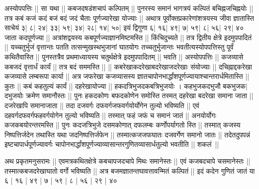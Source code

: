 \documentclass[12pt]{article}
\begin{document}
\pstart
{\s अस्योपपत्तिः || सा यथा ||
कबजदषडंशचापं कल्पितम् ||
पुनरस्य समानं भागत्रयं कल्पितं बचिह्नजचिह्नयोः ||
तत्र कबं कजं कदं बजं बदं जदं चैताः
पूर्णज्यारेखा योज्याः ||
अथात्र पूर्वोक्तप्रकारेणांशत्रयस्य जीवा ज्ञातास्ति साचेयं
३| ८| २४| ३३| ५९| ३४| २८| १४| ५०| इयं द्विगुणा
६| १६| ४९| ७| ५९| ८| ५६| २९| ४० जाता कदपूर्णज्या ||
अत्रांशद्वयस्य कबपूर्णज्याज्ञानमिष्टमस्ति ||
किंचिदुच्यते ||
तत्र
द्वितीय क्षेत्रे इदमुपपादितं ||
यच्चतुर्भुजं वृत्तान्तः पतति तत्सन्मुखस्थभुजानां घातयोगः
तच्चतुर्भुजान्तः
भवतीत्यस्योपपत्तिस्तु पूर्वं कथितैवास्ति ||
पुनस्तत्रैव प्रथ\-माध्यायस्य चतुर्थक्षेत्रे इदमुपपादितम् ||
%
{
} 
 भवति ||
अस्योपपत्तिः ||
कजव्यासे कबजदं वृत्तार्धं कार्यं ||
तत्र बदं 
सममस्ति || ||
कबरेखाकदरेखा\-बदरेखा\-जदरेखाः संयोज्याः ||
दचिह्नाद्दकरेखा कजव्यासे लम्बरूपा कार्या ||
अत्र जफरेखा कजव्यासस्य ज्ञातचापोनभार्द्धांशपूर्णज्यायाश्चान्तरार्धमितास्ति ||
कुतः ||
कबं कहतुल्यं कार्यं ||
दहरेखायोज्या ||
हकदत्रिभुज\-दकबत्रिभुजयोः ।
कहभुजकदभुजौ बकभुजक$|$%
दभुजयोः
क्रमेण समानौस्तः || पुनः हकदकोणः बफदकोणेन समोस्ति तस्मत् दहरेखा बदरेखा समाना जाता || दजरेखापि समानाजाता || तदा दजवर्गः दफवर्गजफवर्गयोर्योगेन तुल्यो भविष्यति ||
एवं दहवर्गदफवर्गफहवर्गयोगेन तुल्यो भविष्यति ||
तस्मात् फहं जफं च समानं जातं || अनयोर्योगः कजकबयोरन्तरमस्ति || पुनः कदजत्रिभुजे दसमकोणात् दफलम्बः कर्णोपर्यागतो स्ति ||
तस्मात् कजस्य निष्पत्तिर्जदेन तथास्ति
यथा जदनिष्पत्तिर्जफेन || तस्मात्कजजफघातः दजवर्गेण समानो जातः ||
तदेतदुपपन्नं इष्टचापार्धपूर्णज्यावर्गः चापोनभार्द्धांशपूर्णज्याव्यासान्तरगुणितव्यासार्धतुल्यो भवतीति ||
शकलं~||}
\pend

\vskip15pt

\pstart
{\s अथ प्रकृतमनुसरामः ||
एवमत्रकथितक्षेत्रे कबचापजदचापे मिथः समानेस्तः ||
एवं कजबदचापे चसमानेस्तः || तस्मात्कबजदरेखाघातो वर्गो भविष्यति ||
अत्र बजमज्ञातन्तघावत्तावन्मितं कल्पितं || इदं कदेन गुणितं जातं या
६ | १६ | ४९ | ७ | ५९ | ८ | ५६ | २९ | ४०}
\pend
\end{document}
